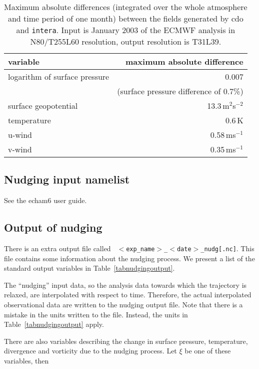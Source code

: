 \begin{appendix}
\begin{table}[tb]
\caption{Maximum absolute differences (integrated over the whole atmosphere and
  time period of one month) between the fields generated by cdo and
  {\tt intera}. Input is January 2003 of the ECMWF analysis in
  N80/T255L60 resolution, output resolution is T31L39.} 
\vspace{-2mm}
\label{tabaccuracy}
\vskip4mm
\centering
\begin{tabular*}{\textwidth}{l@{\extracolsep\fill}r}
\hline 
variable                 & maximum absolute difference \\
\hline 
logarithm of surface pressure   &  0.007 \\
                         & (surface pressure difference of 0.7\%)\\
surface geopotential	 &  13.3\,m$^{2}$s$^{-2}$\\
temperature              &  0.6\,K\\
u-wind                   &  0.58\,ms$^{-1}$\\
v-wind                   &  0.35\,ms$^{-1}$\\
\hline 
\end{tabular*}
\end{table}

\subsection{Nudging input namelist}

See the echam6 user guide.

\subsection{Output of nudging}

There is an extra output file called {\tt
  $<$exp\_name$>$\_$<$date$>$\_nudg[.nc]}. This file contains some
information about the nudging process. We present a list of the
standard output variables in Table~\ref{tabnudgingoutput}.

The ``nudging'' input data, so the analysis data towards which the
\echam{} trajectory is relaxed, are interpolated with respect to
time. Therefore, the actual interpolated observational data are
written to the nudging output file. Note that there is a mistake in
the units written to the file. Instead, the units in
Table~\ref{tabnudgingoutput} apply.

There are also variables describing the change in surface pressure,
temperature, divergence and vorticity due to the nudging process. Let
$\xi$ be one of these variables, then


\end{appendix}
